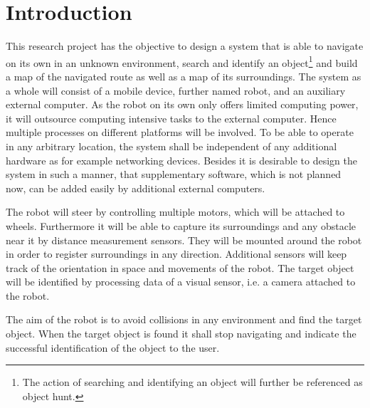 \cleardoublepage
\pagestyle{fancy} %
\fancyhead{}
\fancyhf{}
\renewcommand{\headrulewidth}{0pt}
\renewcommand{\footrulewidth}{0.4pt}

\section{Introduction}

This research project has the objective to design a system that is able to navigate on its own in an unknown environment, search and identify an object\footnote{The action of searching and identifying an object will further be referenced as object hunt.} and build a map of the navigated route as well as a map of its surroundings. The system as a whole will consist of a mobile device, further named robot, and an auxiliary external computer. As the robot on its own only offers limited computing power, it will outsource computing intensive tasks to the external computer. Hence multiple processes on different platforms will be involved. To be able to operate in any arbitrary location, the system shall be independent of any additional hardware as for example networking devices. Besides it is desirable to design the system in such a manner, that supplementary software, which is not planned now, can be added easily by additional external computers.

The robot will steer by controlling multiple motors, which will be attached to wheels. Furthermore it will be able to capture its surroundings and any obstacle near it by distance measurement sensors. They will be mounted around the robot in order to register surroundings in any direction. Additional sensors will keep track of the orientation in space and movements of the robot. The target object will be identified by processing data of a visual sensor, i.e. a camera attached to the robot.

The aim of the robot is to avoid collisions in any environment and find the target object. When the target object is found it shall stop navigating and indicate the successful identification of the object to the user.




